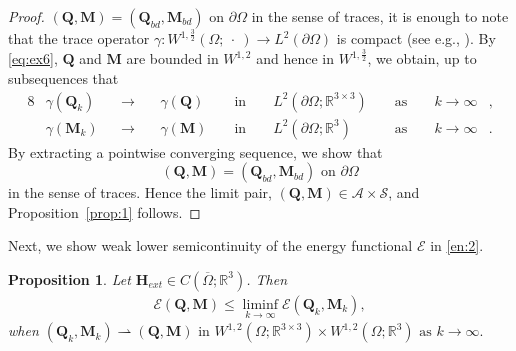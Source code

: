 \documentclass{article}
\newtheorem{proposition}[theorem]{Proposition}
\def\Qvec{\mathbf{Q}}
\def \Mvec{\mathbf{M}}
\def\Hvec{\mathbf{H}}
\begin{document}
\begin{proof}
$\left(\Qvec, \Mvec\right) = \left(\Qvec_{bd}, \Mvec_{bd}\right) \mbox{ on } \partial\Omega$
in the sense of traces, it is enough to note that the trace operator $\gamma: W^{1, \frac{3}{2}}\left(\Omega;~ \cdot~\right)\rightarrow L^2\left(\partial\Omega\right)$ is compact (see e.g., \cite[Theorem 6.1-7(b)]{ciarlet2021mathematical}). By \eqref{eq:ex6}, $\Qvec$ and $\Mvec$ are bounded in $W^{1,2}$ and hence in $W^{1,\frac{3}{2}}$, we obtain,  up to subsequences that  
\begin{alignat}{8}
&\gamma\left(\Qvec_k\right)& &\rightarrow~& &\gamma\left(\Qvec\right)& &\mbox{ in }& &L^2\left(\partial\Omega; \mathbb R^{3\times 3}\right)& &\mbox{ as }& &k\rightarrow\infty&,\label{eq:ex7}\\
&\gamma\left(\Mvec_k\right)& &\rightarrow~& &\gamma\left(\Mvec\right)& &\mbox{ in }& &L^2\left(\partial\Omega; \mathbb R^3\right)& &\mbox{ as }& &k\rightarrow\infty&.\label{eq:ex8}
\end{alignat}
By extracting a pointwise converging sequence, we show that
$$\left(\Qvec, \Mvec\right) = \left(\Qvec_{bd}, \Mvec_{bd}\right) \mbox{ on } \partial\Omega$$
in the sense of traces. Hence the limit pair, $\left(\Qvec, \Mvec\right)\in\mathcal{A}\times\mathcal{S}$, and Proposition~\ref{prop:1} follows.
\end{proof}
Next, we show weak lower semicontinuity of the energy functional $\mathcal{E}$ in \eqref{en:2}.
\begin{proposition}\label{prop:2}
Let $\Hvec_{ext}\in C\left(\overline{\Omega}; \mathbb R^3\right)$. 
Then 
\begin{eqnarray}\label{wls1}
\mathcal{E}\left(\Qvec, \Mvec\right)\le \liminf_{k\rightarrow\infty} \mathcal{E}\left(\Qvec_k, \Mvec_k\right),
\end{eqnarray}when $\left(\Qvec_k, \Mvec_k\right)\rightharpoonup \left(\Qvec, \Mvec\right) \mbox{ in } W^{1,2}\left(\Omega; \mathbb{R}^{3\times 3}\right)\times W^{1,2}\left(\Omega; \mathbb R^3\right) \mbox{ as } k\to\infty.$
\end{proposition}
\end{document}

